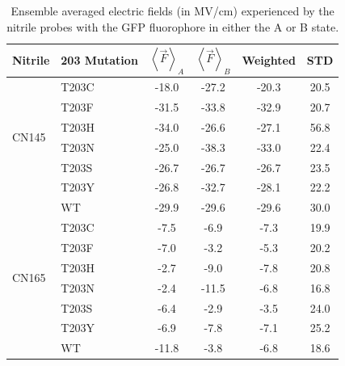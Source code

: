 \begin{table}
    \caption[Calculated fields experienced by the nitrile in each fluorophore state]{
        Ensemble averaged electric fields (in MV/cm) experienced by the nitrile probes with the GFP fluorophore in either the A or B state.
    }
    \begin{center}
    \begin{tabular}{ll| cccc}
    \toprule
    Nitrile & 203 Mutation & $\left < \vec{F} \right >_A $ & $\left < \vec{F} \right >_B $ & Weighted & STD \\
    \toprule
    \multirow{6}{*}{CN145}
     & T203C  & -18.0 & -27.2 & -20.3 & 20.5 \\
     & T203F  & -31.5 & -33.8 & -32.9 & 20.7 \\
     & T203H  & -34.0 & -26.6 & -27.1 & 56.8 \\
     & T203N  & -25.0 & -38.3 & -33.0 & 22.4 \\
     & T203S  & -26.7 & -26.7 & -26.7 & 23.5 \\
     & T203Y  & -26.8 & -32.7 & -28.1 & 22.2 \\
     & WT     & -29.9 & -29.6 & -29.6 & 30.0 \\
    \midrule
    \multirow{6}{*}{CN165}
     & T203C  & -7.5  & -6.9  & -7.3  & 19.9 \\
     & T203F  & -7.0  & -3.2  & -5.3  & 20.2 \\
     & T203H  & -2.7  & -9.0  & -7.8  & 20.8 \\
     & T203N  & -2.4  & -11.5 & -6.8  & 16.8 \\
     & T203S  & -6.4  & -2.9  & -3.5  & 24.0 \\
     & T203Y  & -6.9  & -7.8  & -7.1  & 25.2 \\
     & WT     & -11.8 & -3.8  & -6.8  & 18.6 \\
    \bottomrule

    \end{tabular}
    \end{center}
    \label{tbl:ind_forces}
\end{table}

